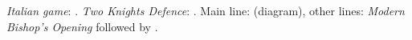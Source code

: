 \emph{Italian game}: .
\emph{Two Knights Defence}: .
Main line:  (diagram), other lines: \emph{Modern Bishop’s Opening}  followed by .